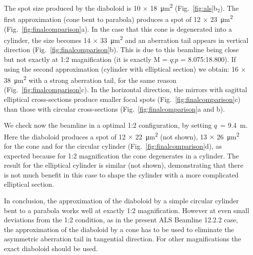 \documentclass{iucr}       %
\begin{document}
The spot size produced by the diaboloid is 10 $\times$ \SI{18}{\micro\meter^2} (Fig.~\ref{fig:als}b$_2$). The first approximation (cone bent to parabola) produces a spot of 12 $\times$ \SI{23}{\micro\meter^2} (Fig.~\ref{fig:finalcomparison}a). In the case that this cone is degenerated into a cylinder, the size becomes 14 $\times$ \SI{33}{\micro\meter^2} and an aberration tail appears in vertical direction (Fig.~\ref{fig:finalcomparison}b). This is due to this beamline being close but not exactly at 1:2 magnification (it is exactly M = $q$:$p$ = 8.075:18.800). If using the second approximation (cylinder with elliptical section) we obtain: 16 $\times$ \SI{38}{\micro\meter^2} with a strong aberration tail, for the same reason (Fig.~\ref{fig:finalcomparison}c). In the horizontal direction, the mirrors with sagittal elliptical cross-sections produce smaller focal spots (Fig.~\ref{fig:finalcomparison}c) than those with circular cross-sections (Fig.~\ref{fig:finalcomparison}a and b).

We check now the beamline in a optimal 1:2 configuration, by setting $q$~= \SI{9.4}{\meter}. Here the diaboloid produces a spot of 12 $\times$ \SI{22}{\micro\meter^2} (not shown), 13 $\times$ \SI{26}{\micro\meter^2} for the cone and for the circular cylinder (Fig.~\ref{fig:finalcomparison}d), as expected because for 1:2 magnification the cone degenerates in a cylinder. The result for the elliptical cylinder is similar (not shown), demonstrating that there is not much benefit in this case to shape the cylinder with a more complicated elliptical section.  

In conclusion, the approximation of the diaboloid by a simple circular cylinder bent to a parabola works well at exactly 1:2 magnification. However at even small deviations from the 1:2 condition, as in the present ALS Beamline 12.2.2 case, the approximation of the diaboloid by a cone has to be used to eliminate the asymmetric aberration tail in tangential direction. For other magnifications the exact diaboloid should be used.
\end{document}
